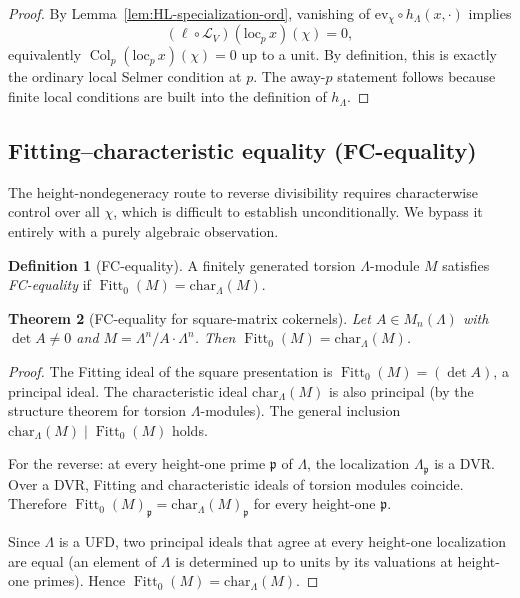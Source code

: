 \documentclass[12pt,reqno]{amsart}
\newtheorem{theorem}{Theorem}[section]
\theoremstyle{definition}
\newtheorem{definition}[theorem]{Definition}
\theoremstyle{remark}
\newcommand{\Lam}{\Lambda}
\newcommand{\chr}{\mathrm{char}}
\DeclareMathOperator{\Col}{Col}
\DeclareMathOperator{\Fitt}{Fitt}
\begin{document}
\begin{proof}
By Lemma~\ref{lem:HL-specialization-ord}, vanishing of $\mathrm{ev}_\chi\circ h_\Lam(x,\cdot)$ implies
\[
(\ell\circ\mathcal L_V)(\mathrm{loc}_p\,x)(\chi)=0,
\]
equivalently $\Col_p(\mathrm{loc}_p\,x)(\chi)=0$ up to a unit. By definition, this is exactly the ordinary local Selmer condition at $p$. The away-$p$ statement follows because finite local conditions are built into the definition of $h_\Lam$.
\end{proof}

\subsection{Fitting--characteristic equality (FC-equality)}

The height-nondegeneracy route to reverse divisibility requires characterwise control over all $\chi$, which is difficult to establish unconditionally.  We bypass it entirely with a purely algebraic observation.

\begin{definition}[FC-equality]\label{def:FC}
A finitely generated torsion $\Lam$-module $M$ satisfies \emph{FC-equality} if $\Fitt_0(M)=\chr_\Lam(M)$.
\end{definition}

\begin{theorem}[FC-equality for square-matrix cokernels]\label{thm:FC}
Let $A\in M_n(\Lam)$ with $\det A\ne 0$ and $M=\Lam^n/A\cdot\Lam^n$.  Then $\Fitt_0(M)=\chr_\Lam(M)$.
\end{theorem}

\begin{proof}
The Fitting ideal of the square presentation is $\Fitt_0(M)=(\det A)$, a principal ideal.  The characteristic ideal $\chr_\Lam(M)$ is also principal (by the structure theorem for torsion $\Lam$-modules).  The general inclusion $\chr_\Lam(M)\mid\Fitt_0(M)$ holds.

For the reverse: at every height-one prime $\mathfrak p$ of $\Lam$, the localization $\Lam_{\mathfrak p}$ is a DVR.  Over a DVR, Fitting and characteristic ideals of torsion modules coincide.  Therefore $\Fitt_0(M)_{\mathfrak p}=\chr_\Lam(M)_{\mathfrak p}$ for every height-one $\mathfrak p$.

Since $\Lam$ is a UFD, two principal ideals that agree at every height-one localization are equal (an element of $\Lam$ is determined up to units by its valuations at height-one primes).  Hence $\Fitt_0(M)=\chr_\Lam(M)$.
\end{proof}
\end{document}

